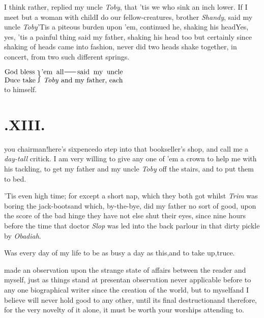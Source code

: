 \documentclass{article}
\begin{document}
I think rather, replied my uncle \textit{Toby}, that ’tis we who sink an inch lower.\tsh
If I meet but a woman with child\tsk I do
our fellow-creatures, brother \textit{Shandy},\break
said my uncle \textit{Toby}\tsk ’Tis a
piteous burden upon ’em, continued he, shaking his head\tsk Yes, yes, ’tis a painful
thing\tsk\break
said my father, shaking his head too\tsk\break
but certainly since shaking of heads
came into fashion, never did two heads shake together, in concert, from two such
different springs.

\indent$\displaystyle\vcenter{\halign{#\rlap{\phantom{y}}\hss\cr
God bless\cr
Duce take\cr}}\,\Big\}
\vcenter{\halign{#\cr
’em all\tsk said my uncle\cr
\;\textit{Toby} and my father, each\cr}}$
\\[4pt] to himself.

\smallskip
\section{.\enspace XIII.} 

\tsk you chairman!\tsk here’s\break
sixpence\tsk do step into that book\-seller’s shop, and call me a
\textit{day-tall}\break
critick. I am very willing to give any one of ’em a crown to help me
with his tackling, to get my father and my uncle \textit{Toby} off
the stairs, and to put them to bed.\tsk

\tsk ’Tis even high time; for except a short nap, which
they both got whilst \textit{Trim} was boring the
jack-boots\tsk and which, by-the-bye, did my father no sort of
good, upon the score of the bad hinge\break
\tsk they have not else shut their eyes, since
nine hours before the time that doctor \textit{Slop} was led into the
back parlour in that dirty pickle by \textit{Obadiah}.

Was every day of my life to be as\break
busy a day as this,\tsk and to take up,\tsk truce.

made an observation upon the strange state of affairs between the reader and myself,
just as things stand at present\tsk an observation never
applicable before to any one biographical writer since the creation
of the world, but to myself\tsk and I believe will never hold
good to any other, until its final destruction\tsk\break and therefore,
for the very novelty of it alone, it must be worth your worships
attending to.
\end{document}
